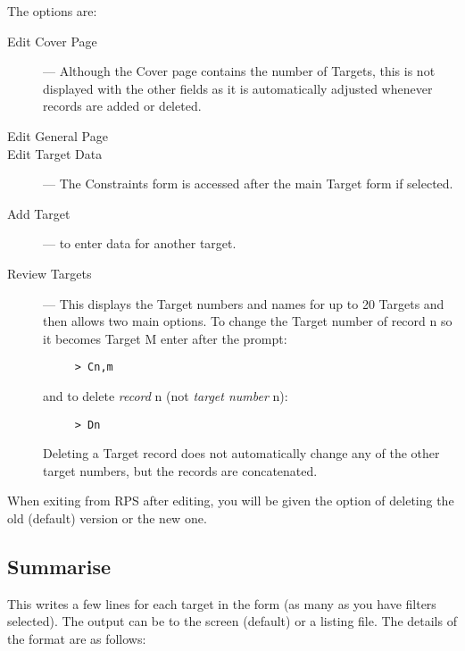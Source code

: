 The options are:

\begin{description}
\begin{description}

\item [Edit Cover Page] --- Although the Cover page contains the number
of Targets, this is not displayed with the other fields as it is
automatically adjusted whenever records are added or deleted.

\item [Edit General Page] 

\item [Edit Target Data] --- The Constraints form is accessed after the
main Target form if selected.

\item [Add Target] --- to enter data for another target.

\item [Review Targets] --- This displays the Target numbers and names
for up to 20 Targets and then allows two main options. To change the
Target number of record n so it becomes Target M enter after the
prompt:

\begin{verbatim}
     > Cn,m
\end{verbatim}

and to delete {\em record} n (not {\em target number} n):

\begin{verbatim}
     > Dn
\end{verbatim}

Deleting a Target record does not automatically change any of the other
target numbers, but the records are concatenated.

\end{description}
\end{description}

When exiting from RPS after editing, you will be given the option of
deleting the old (default) version or the new one.

\subsection{Summarise}

This writes a few lines for each target in the form (as many as you
have filters selected).  The output can be to the screen (default) or a
listing file.  The details of the format are as follows:

